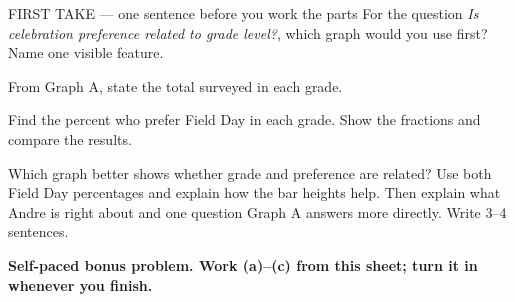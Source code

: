 \documentclass[14pt]{extarticle}
\begin{document}
\begin{firsttakebox}{FIRST TAKE --- one sentence before you work the parts}
For the question \emph{Is celebration preference related to grade level?}, which graph would you use first? Name one visible feature.
\end{firsttakebox}

\begin{description}[leftmargin=1.15in, labelwidth=1in, itemsep=2pt, topsep=2pt]
  \item[\dokbadge{1}~(a)] From Graph A, state the total surveyed in each grade.
  \item[\dokbadge{2}~(b)] Find the percent who prefer Field Day in each grade. Show the fractions and compare the results.
  \item[\dokbadge{3}~(c)] Which graph better shows whether grade and preference are related? Use both Field Day percentages and explain how the bar heights help. Then explain what Andre is right about and one question Graph A answers more directly. Write 3--4 sentences.
\end{description}

\vfill
\textbf{Self-paced bonus problem. Work (a)--(c) from this sheet; turn it in whenever you finish.}
\end{document}
